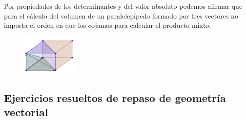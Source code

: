 \begin{multicols}{2}
Por propiedades de los determinantes y del valor absoluto podemos afirmar que para el cálculo del volumen de un paralelepípedo formado por tres vectores no importa el orden en que los cojamos para calcular el producto mixto.
\begin{figure}[H]
	\centering
	\includegraphics[width=0.25\textwidth]{imagenes/imagenescv/T10IM13.png}
\end{figure}
\end{multicols}


\subsection{Ejercicios resueltos de repaso de geometría vectorial}


